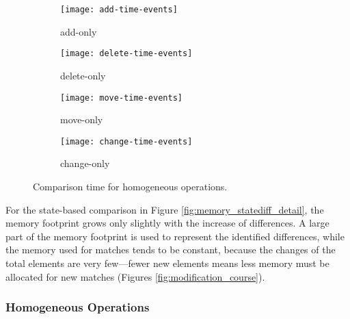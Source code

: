 \begin{figure}[ht]
  \centering
  \begin{subfigure}[t]{0.495\linewidth}
    \texttt{[image: add-time-events]}
    \caption{add-only}
    \label{fig:add-time-events}
  \end{subfigure}
  \hfill
  \begin{subfigure}[t]{0.495\linewidth}
    \texttt{[image: delete-time-events]}
    \caption{delete-only}
    \label{fig:delete-time-events}
  \end{subfigure}
  \begin{subfigure}[t]{0.495\linewidth}
    \texttt{[image: move-time-events]}
    \caption{move-only}
    \label{fig:move-time-events}
  \end{subfigure}
  \hfill
  \begin{subfigure}[t]{0.495\linewidth}
    \texttt{[image: change-time-events]}
    \caption{change-only}
    \label{fig:change-time-events}
  \end{subfigure}
  \caption{Comparison time for homogeneous operations.}
  \label{fig:operation_time_events}
\end{figure}



For the state-based comparison in Figure \ref{fig:memory_statediff_detail}, the memory footprint grows only slightly with the increase of differences. A large part of the memory footprint is used to represent the identified differences, while the memory used for matches tends to be constant, because the changes of the total elements are very few—fewer new elements means less memory must be allocated for new matches (Figures \ref{fig:modification_course}).


\subsubsection{Homogeneous Operations}
\label{sec:homogeneous-operation}

